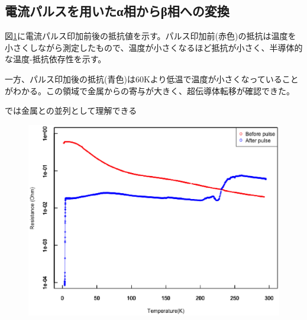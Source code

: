 \subsection{電流パルスを用いたα相からβ相への変換}
図\ref{fig:181228_before_after_pulse_log}に電流パルス印加前後の抵抗値を示す。パルス印加前(赤色)の抵抗は温度を小さくしながら測定したもので、温度が小さくなるほど抵抗が小さく、半導体的な温度-抵抗依存性を示す。

一方、パルス印加後の抵抗(青色)は60Kより低温で温度が小さくなっていることがわかる。この領域で金属からの寄与が大きく、超伝導体転移が確認できた。

では金属との並列として理解できる\cite{Mayr,McLachlan}

\begin{figure}[htb]
    \begin{center}
   \includegraphics[width=150mm]{results_discussions/181228_before_after_pulse_log.eps}
  \end{center}
  \caption{}
  \label{fig:181228_before_after_pulse_log}
\end{figure}

